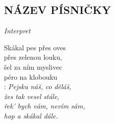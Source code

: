 \begin{flushleft}
	\section*{\Huge NÁZEV PÍSNIČKY}
	\emph{Interpret}
\end{flushleft}

Skákal pes přes oves \\
přes zelenou louku, \\
šel za ním myslivec \\
péro na klobouku \\

\textregistered:
\emph{
Pejsku náš, co děláš,\\
žes tak vesel stále, \\
řek' bych vám, nevím sám,\\
hop a skákal dále.}


\newpage
